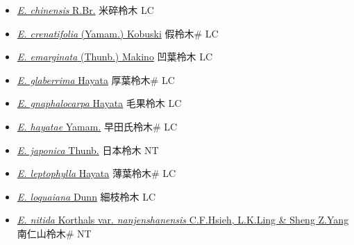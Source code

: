 \begin{itemize}
  \begin{itemize}
        \item[] \href{http://www.theplantlist.org/tpl1.1/search?q=Eurya+chinensis}{\textit{E. chinensis} R.Br.}   米碎柃木 LC
        \item[] \href{http://www.theplantlist.org/tpl1.1/search?q=Eurya+crenatifolia}{\textit{E. crenatifolia} (Yamam.) Kobuski}   假柃木\# LC
        \item[] \href{http://www.theplantlist.org/tpl1.1/search?q=Eurya+emarginata}{\textit{E. emarginata} (Thunb.) Makino}   凹葉柃木 LC
        \item[] \href{http://www.theplantlist.org/tpl1.1/search?q=Eurya+glaberrima}{\textit{E. glaberrima} Hayata}   厚葉柃木\# LC
        \item[] \href{http://www.theplantlist.org/tpl1.1/search?q=Eurya+gnaphalocarpa}{\textit{E. gnaphalocarpa} Hayata}   毛果柃木 LC
        \item[] \href{http://www.theplantlist.org/tpl1.1/search?q=Eurya+hayatae}{\textit{E. hayatae} Yamam.}   早田氏柃木\# LC
        \item[] \href{http://www.theplantlist.org/tpl1.1/search?q=Eurya+japonica}{\textit{E. japonica} Thunb.}   日本柃木 NT
        \item[] \href{http://www.theplantlist.org/tpl1.1/search?q=Eurya+leptophylla}{\textit{E. leptophylla} Hayata}   薄葉柃木\# LC
        \item[] \href{http://www.theplantlist.org/tpl1.1/search?q=Eurya+loquaiana}{\textit{E. loquaiana} Dunn}   細枝柃木 LC
        \item[] \href{http://www.theplantlist.org/tpl1.1/search?q=Eurya+nitida+var.+nanjenshanensis}{\textit{E. nitida} Korthals var. \textit{nanjenshanensis} C.F.Hsieh, L.K.Ling \& Sheng Z.Yang}   南仁山柃木\# NT

\end{itemize}
\end{itemize}
